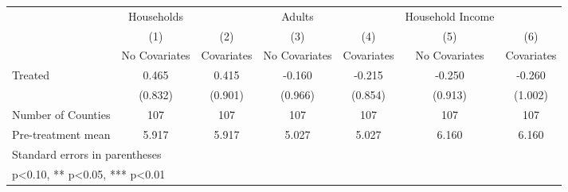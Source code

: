 {
\def\sym#1{\ifmmode^{#1}\else\(^{#1}\)\fi}
\begin{tabular}{l*{6}{c}}
\hline\hline
            &  Households   &               &      Adults   &               &Household Income   &               \\
            &\multicolumn{1}{c}{(1)}&\multicolumn{1}{c}{(2)}&\multicolumn{1}{c}{(3)}&\multicolumn{1}{c}{(4)}&\multicolumn{1}{c}{(5)}&\multicolumn{1}{c}{(6)}\\
            &\multicolumn{1}{c}{No Covariates}&\multicolumn{1}{c}{Covariates}&\multicolumn{1}{c}{No Covariates}&\multicolumn{1}{c}{Covariates}&\multicolumn{1}{c}{No Covariates}&\multicolumn{1}{c}{Covariates}\\
\hline
Treated     &       0.465   &       0.415   &      -0.160   &      -0.215   &      -0.250   &      -0.260   \\
            &     (0.832)   &     (0.901)   &     (0.966)   &     (0.854)   &     (0.913)   &     (1.002)   \\
\hline
Number of Counties&         107   &         107   &         107   &         107   &         107   &         107   \\
Pre-treatment mean&       5.917   &       5.917   &       5.027   &       5.027   &       6.160   &       6.160   \\
\hline\hline
\multicolumn{7}{l}{\footnotesize Standard errors in parentheses}\\
\multicolumn{7}{l}{\footnotesize * p<0.10, ** p<0.05, *** p<0.01}\\
\end{tabular}
}
